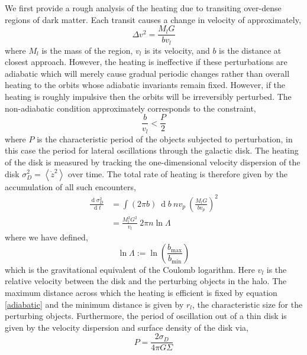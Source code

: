\documentclass[usenatbib]{mnras}
\renewcommand{\d}[1]{\! \mathrm{d}#1 \:}
\newcommand{\deriv}[2]{\frac{\d{#1}}{\d{#2}}}
\renewcommand{\d}[1]{\ensuremath{\operatorname{d}\!{#1}}}
\begin{document}
We first provide a rough analysis of the heating due to transiting over-dense regions of dark matter. Each transit causes a change in velocity of approximately,
\begin{equation}
\Delta v^2 = \frac{M_l G}{b v_l}
\end{equation}
where $M_l$ is the mass of the region, $v_l$ is its velocity, and $b$ is the distance at closest approach. However, the heating is ineffective if these perturbations are adiabatic which will merely cause gradual periodic changes rather than overall heating to the orbits whose adiabatic invariants remain fixed. However, if the heating is roughly impulsive then the orbits will be irreversibly perturbed. The non-adiabatic condition approximately corresponds to the constraint,
\begin{equation} \label{adiabatic}
\frac{b}{v_l} < \frac{P}{2}
\end{equation}
where $P$ is the characteristic period of the objects subjected to perturbation, in this case the period for lateral oscillations through the galactic disk. The heating of the disk is measured by tracking the one-dimensional velocity dispersion of the disk $\sigma_D^2 = \left< \dot{z}^2 \right>$ over time. The total rate of heating is therefore given by the accumulation of all such encounters,
\begin{subequations}
\begin{align}
\deriv{\sigma_D^2}{t} &= \int (2 \pi b) \: \d{b} \: n v_p \: \left( \frac{M_l G}{b v_p} \right)^2 
\\
& = \frac{M_l^2 G^2}{v_l} \: 2 \pi n \ln{\Lambda}
\end{align}
\end{subequations}
where we have defined,
\begin{equation}
\ln{\Lambda} := \ln{\left( \frac{b_{\text{max}}}{b_{\text{min}}} \right)}
\end{equation}
which is the gravitational equivalent of the Coulomb logarithm. Here $v_l$ is the relative velocity between the disk and the perturbing objects in the halo. 
The maximum distance across which the heating is efficient is fixed by equation \eqref{adiabatic} and the minimum distance is given by $r_l$, the characteristic size for the perturbing objects. Furthermore, the period of oscillation out of a thin disk is given by the velocity dispersion and surface density of the disk via,
\begin{equation}
P = \frac{2 \sigma_D}{4 \pi G \Sigma}
\end{equation} 
\end{document}
